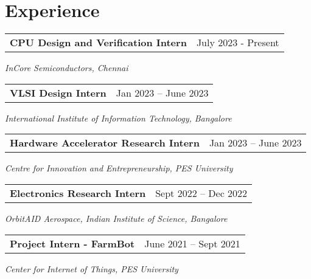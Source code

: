 \section{\sc Experience}

\begin{tabular}{@{}p{4in}p{2in}}
{\bf{CPU Design and Verification Intern}}  & July 2023 - Present \\
\end{tabular}  
    \textit{InCore Semiconductors, Chennai} 

   
   \begin{tabular}{@{}p{4in}p{2in}}
    {\bf{VLSI Design Intern}} & Jan 2023 – June 2023 \\
   \end{tabular}
   \textit{International Institute of Information Technology, Bangalore}  


   \begin{tabular}{@{}p{4in}p{2in}}
    {\bf{Hardware Accelerator Research Intern}}  & Jan 2023 – June 2023 \\
   \end{tabular}
   \textit{Centre for Innovation and Entrepreneurship, PES University} 

   \begin{tabular}{@{}p{4in}p{2in}}
    {\bf{Electronics Research Intern}} & Sept 2022 – Dec 2022 \\
   \end{tabular}
   \textit{OrbitAID Aerospace, Indian Institute of Science, Bangalore}  

   \begin{tabular}{@{}p{4in}p{2in}}
    {\bf{Project Intern - FarmBot}} & June 2021 – Sept 2021 \\
   \end{tabular}
   \textit{Center for Internet of Things, PES University}  

   \endinput